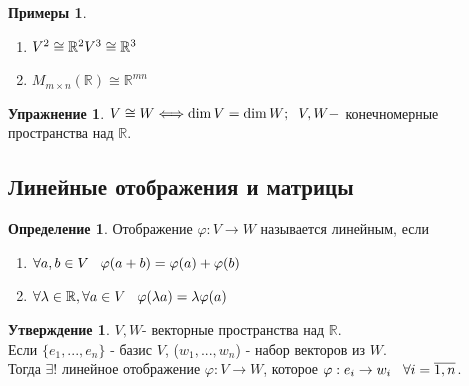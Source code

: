 \documentclass[a4paper, 12pt]{article}
\newcommand{\R}{\mathbb R}
\renewcommand{\phi}{\varphi}
\newcommand\tab[1][.5cm]{\hspace*{#1}}
\theoremstyle{definition}
\newtheorem*{definition}{Определение}
\newtheorem*{subtheorem}{Утверждение}
\newtheorem*{example}{Примеры}
\newtheorem*{lalala}{Упражнение}
\begin{document}
  \begin{example}\end{example}
  \begin{enumerate}
    \item $V^2 \cong \R^2 \\ V^3 \cong \R^3$ 
    \item $M_{m \times n}(\R) \cong \R^{mn}$
  \end{enumerate}
  \begin{lalala}
    $V \cong W \Longleftrightarrow \dim V = \dim W; \tab[0.2cm] V,W - $ конечномерные пространства над $\R$.  
  \end{lalala}
  \subsection{Линейные отображения и матрицы}
  \begin{definition}
    Отображение $\phi: V \to W$ называется линейным, если
    \begin{enumerate}
      \item $\forall a,b \in V \tab[0.3cm] \phi(a+b) = \phi(a) + \phi(b)$
      \item $\forall \lambda \in \R, \forall a \in V \tab[0.3cm] \phi(\lambda a) = \lambda \phi(a)$  
    \end{enumerate}
    
  \end{definition} 
  \begin{subtheorem}
    $V,W$- векторные пространства над $\R$. \\
      Если $\{e_1,...,e_n\}$ - базис $V$, ($w_1,...,w_n$) - набор векторов из $W$. \\Тогда $\exists$! линейное отображение $\phi: V \to W$, которое $\phi: e_i \to w_i \tab[0.3cm]\forall i = \overline{1,n}$.
  \end{subtheorem} 
\end{document}
